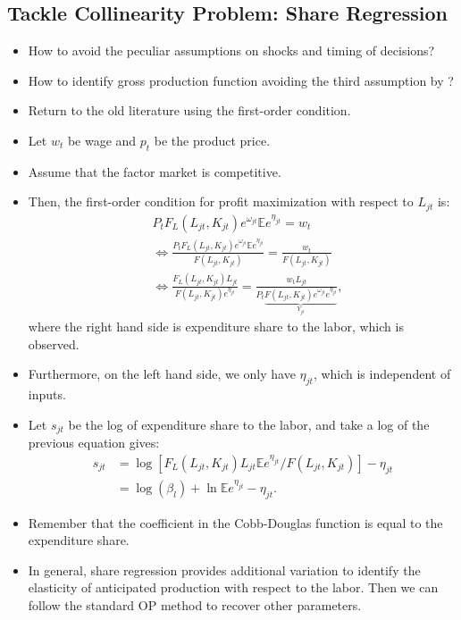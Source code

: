 \documentclass[
]{book}
\begin{document}
\hypertarget{tackle-collinearity-problem-share-regression}{%
\subsection{Tackle Collinearity Problem: Share Regression}\label{tackle-collinearity-problem-share-regression}}

\begin{itemize}
\item
  How to avoid the peculiar assumptions on shocks and timing of decisions?
\item
  How to identify gross production function avoiding the third assumption by \citet{Ackerberg2015}?
\item
  Return to the old literature using the first-order condition.
\item
  Let \(w_t\) be wage and \(p_t\) be the product price.
\item
  Assume that the factor market is competitive.
\item
  Then, the first-order condition for profit maximization with respect to \(L_{jt}\) is:
  \begin{equation}
  \begin{split}
  &P_t F_L(L_{jt}, K_{jt})e^{\omega_{jt}} \mathbb{E} e^{\eta_{jt}} = w_t\\
  &\Leftrightarrow \frac{P_t F_L(L_{jt}, K_{jt})e^{\omega_{jt}} \mathbb{E} e^{\eta_{jt}}}{F(L_{jt}, K_{jt}) } = \frac{w_t}{F(L_{jt}, K_{jt}) }\\
  &\Leftrightarrow \frac{F_L(L_{jt}, K_{jt}) L_{jt}}{F(L_{jt}, K_{jt})  e^{\eta_{jt}} } = \frac{w_t L_{jt}}{P_t \underbrace{F(L_{jt}, K_{jt}) e^{\omega_{jt}} e^{\eta_{jt}}}_{Y_{jt}} },
  \end{split}
  \end{equation}
  where the right hand side is expenditure share to the labor, which is observed.
\item
  Furthermore, on the left hand side, we only have \(\eta_{jt}\), which is independent of inputs.
\item
  Let \(s_{jt}\) be the log of expenditure share to the labor, and take a log of the previous equation gives:
  \begin{equation}
  \begin{split}
  s_{jt} &= \log [F_L(L_{jt}, K_{jt}) L_{jt} \mathbb{E} e^{\eta_{jt}} / F(L_{jt}, K_{jt})] - \eta_{jt}\\
  & = \log(\beta_l) + \ln \mathbb{E} e^{\eta_{jt}} - \eta_{jt}.
  \end{split}
  \end{equation}
\item
  Remember that the coefficient in the Cobb-Douglas function is equal to the expenditure share.
\item
  In general, share regression provides additional variation to identify the elasticity of anticipated production with respect to the labor.
  Then we can follow the standard OP method to recover other parameters.
\end{itemize}
\end{document}

